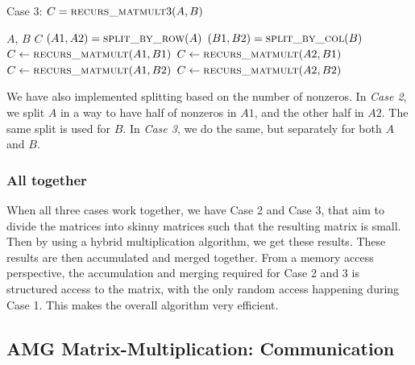 \begin{algorithm}[H] 
  \caption{Case 3: $C = \textsc{recurs\_matmult}3(A, B)$} \label{alg:case3} 
  \begin{algorithmic}[1]
    \Require $A$, $B$
    \Ensure  $C$
    \State $(A1, A2) = \textsc{split\_by\_row}(A)$
    \State $(B1, B2) = \textsc{split\_by\_col}(B)$
    \State $C \leftarrow \textsc{recurs\_matmult}(A1,B1)$
    \State $C \leftarrow \textsc{recurs\_matmult}(A2,B1)$
    \State $C \leftarrow \textsc{recurs\_matmult}(A1,B2)$
    \State $C \leftarrow \textsc{recurs\_matmult}(A2,B2)$
  \end{algorithmic}
\end{algorithm}

We have also implemented splitting based on the number of nonzeros. In \textit{Case 2}, we split $A$ in a way to have half of nonzeros in $A1$, and the other half in $A2$. The same split is used for $B$. In \textit{Case 3}, we do the same, but separately for both $A$ and $B$.

\subsubsection{All together}

When all three cases work together, we have Case 2 and Case 3, that aim to divide the matrices into skinny matrices such that the resulting matrix is small. Then by using a hybrid multiplication algorithm, we get these results. These results are then accumulated and merged together. From a memory access perspective, the accumulation and merging required for Case 2 and 3 is structured access to the matrix, with the only random access happening during Case 1. This makes the overall algorithm very efficient. 

\subsection{AMG Matrix-Multiplication: Communication}
\label{sec:amg}


